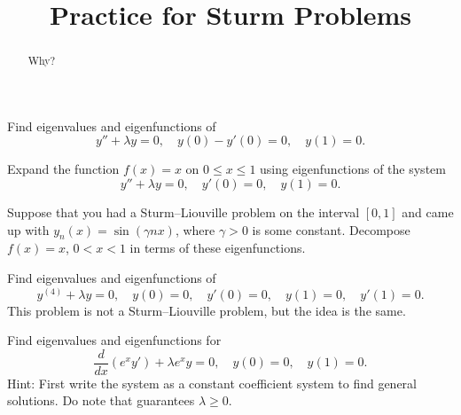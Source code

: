\documentclass{ximera}
\title{Practice for Sturm Problems}
\begin{document}
\begin{abstract}
Why?
\end{abstract}
\maketitle


\begin{exercise}
    Find eigenvalues and eigenfunctions of
    \begin{equation*}
        y''+\lambda y = 0, \quad y(0)- y'(0) = 0, \quad y(1) = 0 .
    \end{equation*}
\end{exercise}

\begin{exercise}
    Expand the function $f(x) = x$ on $0 \leq x \leq 1$ using eigenfunctions of the system
    \begin{equation*}
        y'' + \lambda y = 0, \quad y'(0) = 0, \quad y(1) = 0 .
    \end{equation*}
\end{exercise}

\begin{exercise}
    Suppose that you had a Sturm--Liouville problem on the interval $[0,1]$ and came up with $y_n(x) = \sin (\gamma n x)$, where $\gamma > 0$ is some constant. Decompose $f(x) = x$, $0 < x < 1$ in terms of these eigenfunctions.
\end{exercise}

\begin{exercise}
    Find eigenvalues and eigenfunctions of
    \begin{equation*}
        y^{(4)}+\lambda y = 0, \quad y(0) = 0, \quad y'(0) = 0, \quad y(1) = 0, \quad y'(1) = 0 .
    \end{equation*}
    This problem is not a Sturm--Liouville problem, but the idea is the same.
\end{exercise}

\begin{exercise}%
    Find eigenvalues and eigenfunctions for
    \begin{equation*}
        \frac{d}{dx} (e^x y') + \lambda e^x y = 0, \quad y(0) = 0, \quad y(1) = 0 .
    \end{equation*}
    Hint: First write the system as a constant coefficient system to find general solutions.  Do note that  guarantees $\lambda \geq 0$.
\end{exercise}
\end{document}
